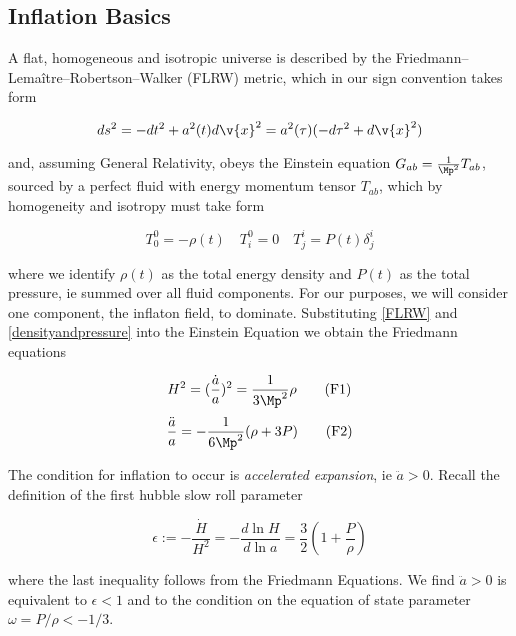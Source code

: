 \subsection{Inflation Basics}

A flat, homogeneous and isotropic universe is described by the Friedmann–Lemaître–Robertson–Walker (FLRW) metric, which in our sign convention takes form

\begin{equation}
\label{FLRW}
ds^2 = - dt^2 + a^2(t)d\v{x}^2 = a^2(\tau)(-d\tau^2+d\v{x}^2)
\end{equation}

and, assuming General Relativity, obeys the Einstein equation $G_{ab} = \frac{1}{\Mp^2} T_{ab}$, sourced by a perfect fluid with energy momentum tensor $T_{ab}$, which by homogeneity and isotropy must take form

\begin{equation}
\label{densityandpressure}
T^0_0 = - \rho(t) \quad T^0_i = 0 \quad T^i_j = P(t)\delta^i_j
\end{equation}

where we  identify $\rho(t)$ as the total energy density and $P(t)$ as the total pressure, ie summed over all fluid components. For our purposes, we will consider one component, the inflaton field, to dominate.  Substituting \ref{FLRW} and \ref{densityandpressure} into the Einstein Equation we obtain the Friedmann equations

\begin{equation}
H^2 = (\frac{\dot{a}}{a})^2 = \frac{1}{3\Mp^2}\rho
\tag{F1}
\label{F1}
\end{equation}
\begin{equation}
\frac{\ddot{a}}{a} = -\frac{1}{6\Mp^2}(\rho + 3P)
\tag{F2}
\label{F2}
\end{equation}

The condition for inflation to occur is \textit{accelerated expansion}, ie $\ddot{a} >0$. Recall the definition of the first hubble slow roll parameter 

\begin{equation}
\label{epsilon}
\epsilon := -\frac{\dot{H}}{H^2} = -\frac{d\ln{H}}{d\ln{a}} = \frac{3}{2}(1+\frac{P}{\rho})
\end{equation}

where the last inequality follows from the Friedmann Equations. We find $\ddot{a} >0$ is equivalent to $\epsilon<1$ and to the condition on the equation of state parameter $\omega=P/\rho < -1/3$.\\ 

